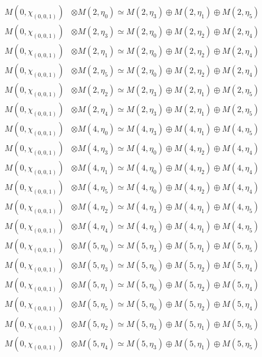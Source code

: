 \begin{align*}
M(0,\chi_{(0,0,1)}) &\otimes M(2,\eta_{0}) \simeq M(2,\eta_{3}) \oplus M(2,\eta_{1}) \oplus M(2,\eta_{5})\\
M(0,\chi_{(0,0,1)}) &\otimes M(2,\eta_{3}) \simeq M(2,\eta_{0}) \oplus M(2,\eta_{2}) \oplus M(2,\eta_{4})\\
M(0,\chi_{(0,0,1)}) &\otimes M(2,\eta_{1}) \simeq M(2,\eta_{0}) \oplus M(2,\eta_{2}) \oplus M(2,\eta_{4})\\
M(0,\chi_{(0,0,1)}) &\otimes M(2,\eta_{5}) \simeq M(2,\eta_{0}) \oplus M(2,\eta_{2}) \oplus M(2,\eta_{4})\\
M(0,\chi_{(0,0,1)}) &\otimes M(2,\eta_{2}) \simeq M(2,\eta_{3}) \oplus M(2,\eta_{1}) \oplus M(2,\eta_{5})\\
M(0,\chi_{(0,0,1)}) &\otimes M(2,\eta_{4}) \simeq M(2,\eta_{3}) \oplus M(2,\eta_{1}) \oplus M(2,\eta_{5})\\
M(0,\chi_{(0,0,1)}) &\otimes M(4,\eta_{0}) \simeq M(4,\eta_{3}) \oplus M(4,\eta_{1}) \oplus M(4,\eta_{5})\\
M(0,\chi_{(0,0,1)}) &\otimes M(4,\eta_{3}) \simeq M(4,\eta_{0}) \oplus M(4,\eta_{2}) \oplus M(4,\eta_{4})\\
M(0,\chi_{(0,0,1)}) &\otimes M(4,\eta_{1}) \simeq M(4,\eta_{0}) \oplus M(4,\eta_{2}) \oplus M(4,\eta_{4})\\
M(0,\chi_{(0,0,1)}) &\otimes M(4,\eta_{5}) \simeq M(4,\eta_{0}) \oplus M(4,\eta_{2}) \oplus M(4,\eta_{4})\\
M(0,\chi_{(0,0,1)}) &\otimes M(4,\eta_{2}) \simeq M(4,\eta_{3}) \oplus M(4,\eta_{1}) \oplus M(4,\eta_{5})\\
M(0,\chi_{(0,0,1)}) &\otimes M(4,\eta_{4}) \simeq M(4,\eta_{3}) \oplus M(4,\eta_{1}) \oplus M(4,\eta_{5})\\
M(0,\chi_{(0,0,1)}) &\otimes M(5,\eta_{0}) \simeq M(5,\eta_{3}) \oplus M(5,\eta_{1}) \oplus M(5,\eta_{5})\\
M(0,\chi_{(0,0,1)}) &\otimes M(5,\eta_{3}) \simeq M(5,\eta_{0}) \oplus M(5,\eta_{2}) \oplus M(5,\eta_{4})\\
M(0,\chi_{(0,0,1)}) &\otimes M(5,\eta_{1}) \simeq M(5,\eta_{0}) \oplus M(5,\eta_{2}) \oplus M(5,\eta_{4})\\
M(0,\chi_{(0,0,1)}) &\otimes M(5,\eta_{5}) \simeq M(5,\eta_{0}) \oplus M(5,\eta_{2}) \oplus M(5,\eta_{4})\\
M(0,\chi_{(0,0,1)}) &\otimes M(5,\eta_{2}) \simeq M(5,\eta_{3}) \oplus M(5,\eta_{1}) \oplus M(5,\eta_{5})\\
M(0,\chi_{(0,0,1)}) &\otimes M(5,\eta_{4}) \simeq M(5,\eta_{3}) \oplus M(5,\eta_{1}) \oplus M(5,\eta_{5})\\
\end{align*}

